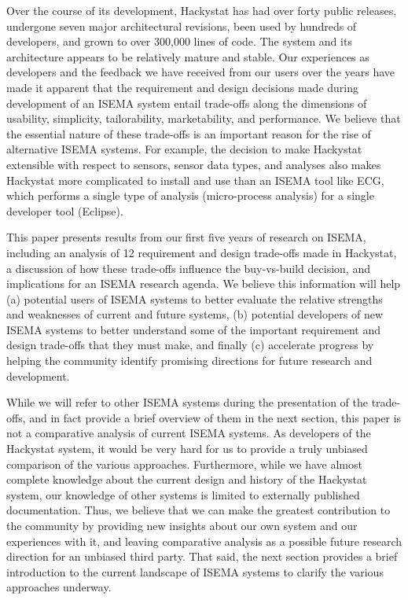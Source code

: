 \documentclass[10pt,twocolumn]{article}
\begin{document}
Over the course of its development, Hackystat has had over forty public
releases, undergone seven major architectural revisions, 
been used by hundreds of developers, and grown to over 300,000 lines of
code. The system and its architecture appears to be relatively mature and
stable. Our experiences as developers and the feedback we have received
from our users over the years have made it apparent that the requirement
and design decisions made during development of an ISEMA system entail
trade-offs along the dimensions of usability, simplicity, tailorability,
marketability, and performance.  We believe that the essential nature of
these trade-offs is an important reason for the rise of alternative ISEMA
systems.  For example, the decision to make Hackystat extensible with respect to
sensors, sensor data types, and analyses also makes Hackystat more
complicated to install and use than an ISEMA tool like ECG, which performs
a single type of analysis (micro-process analysis) for a single developer
tool (Eclipse). 

This paper presents results from our first five years of research on ISEMA,
including an analysis of 12 requirement and design trade-offs made in
Hackystat, a discussion of how these trade-offs influence the buy-vs-build
decision, and implications for an ISEMA research agenda.  We believe this
information will help (a) potential users of ISEMA systems to better
evaluate the relative strengths and weaknesses of current and future
systems, (b) potential developers of new ISEMA systems to better understand
some of the important requirement and design trade-offs that they must
make, and finally (c) accelerate progress by helping the community identify
promising directions for future research and development.

While we will refer to other ISEMA systems during the presentation of the
trade-offs, and in fact provide a brief overview of them in the next
section, this paper is not a comparative analysis of current ISEMA systems.
As developers of the Hackystat system, it would be very hard for us to
provide a truly unbiased comparison of the various approaches. Furthermore,
while we have almost complete knowledge about the current design and
history of the Hackystat system, our knowledge of other systems is limited
to externally published documentation. Thus, we believe that we can make
the greatest contribution to the community by providing new insights about
our own system and our experiences with it, and leaving comparative
analysis as a possible future research direction for an unbiased third
party.  That said, the next section provides a brief introduction to the
current landscape of ISEMA systems to clarify the various approaches
underway.
\end{document}
